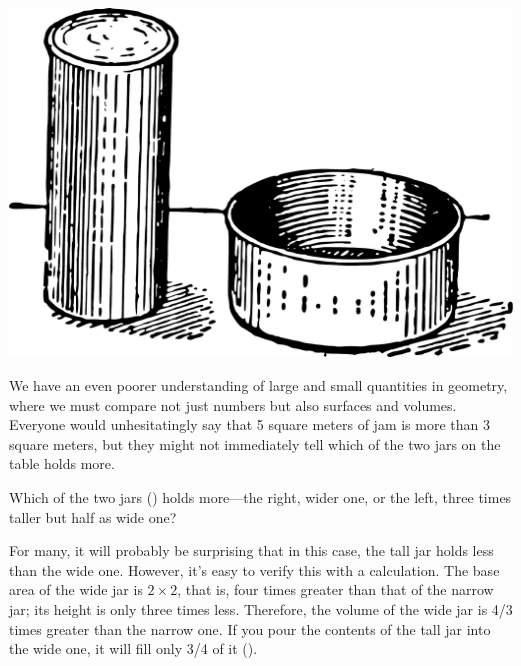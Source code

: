 \begin{marginfigure}[-3cm]%
\centering
\includegraphics[width=\textwidth]{figures/ch-11/fig-165.pdf}
\end{marginfigure}

We have an even poorer understanding of large and small quantities in geometry, where we must compare not just numbers but also surfaces and volumes. Everyone would unhesitatingly say that 5 square meters of jam is more than 3 square meters, but they might not immediately tell which of the two jars on the table holds more.


\ques Which of the two jars () holds more—the right, wider one, or the left, three times taller but half as wide one?

\ans For many, it will probably be surprising that in this case, the tall jar holds less than the wide one. However, it’s easy to verify this with a calculation. The base area of the wide jar is $2 \times 2$, that is, four times greater than that of the narrow jar; its height is only three times less. Therefore, the volume of the wide jar is 4/3 times greater than the narrow one. If you pour the contents of the tall jar into the wide one, it will fill only 3/4 of it ().


